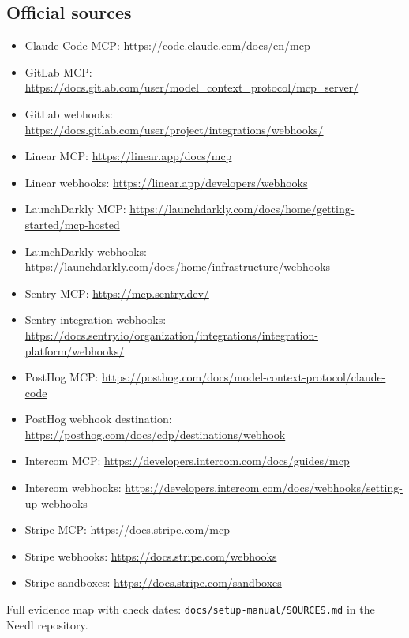 \documentclass[11pt,a4paper]{article}
\newcommand{\lit}[1]{\texttt{#1}}
\begin{document}
\subsection{Official sources}
\begin{itemize}[itemsep=1pt]
\item Claude Code MCP: \url{https://code.claude.com/docs/en/mcp}
\item GitLab MCP: \url{https://docs.gitlab.com/user/model_context_protocol/mcp_server/}
\item GitLab webhooks: \url{https://docs.gitlab.com/user/project/integrations/webhooks/}
\item Linear MCP: \url{https://linear.app/docs/mcp}
\item Linear webhooks: \url{https://linear.app/developers/webhooks}
\item LaunchDarkly MCP: \url{https://launchdarkly.com/docs/home/getting-started/mcp-hosted}
\item LaunchDarkly webhooks: \url{https://launchdarkly.com/docs/home/infrastructure/webhooks}
\item Sentry MCP: \url{https://mcp.sentry.dev/}
\item Sentry integration webhooks: \url{https://docs.sentry.io/organization/integrations/integration-platform/webhooks/}
\item PostHog MCP: \url{https://posthog.com/docs/model-context-protocol/claude-code}
\item PostHog webhook destination: \url{https://posthog.com/docs/cdp/destinations/webhook}
\item Intercom MCP: \url{https://developers.intercom.com/docs/guides/mcp}
\item Intercom webhooks: \url{https://developers.intercom.com/docs/webhooks/setting-up-webhooks}
\item Stripe MCP: \url{https://docs.stripe.com/mcp}
\item Stripe webhooks: \url{https://docs.stripe.com/webhooks}
\item Stripe sandboxes: \url{https://docs.stripe.com/sandboxes}
\end{itemize}
Full evidence map with check dates: \lit{docs/setup-manual/SOURCES.md} in the Needl repository.
\end{document}

